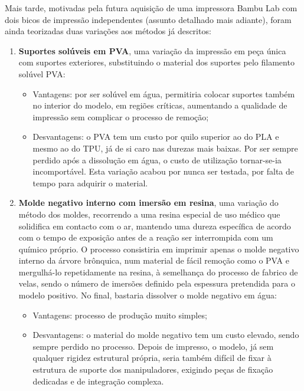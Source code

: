 Mais tarde, motivadas pela futura aquisição de uma impressora Bambu Lab com dois bicos de impressão independentes (assunto detalhado mais adiante), foram ainda teorizadas duas variações aos métodos já descritos:
\begin{enumerate}
  \item \textbf{Suportes solúveis em PVA}, uma variação da impressão em peça única com suportes exteriores, substituindo o material dos suportes pelo filamento solúvel PVA:
  \begin{itemize}
    \item Vantagens: por ser solúvel em água, permitiria colocar suportes também no interior do modelo, em regiões críticas, aumentando a qualidade de impressão sem complicar o processo de remoção;
    \item Desvantagens: o PVA tem um custo por quilo superior ao do PLA e mesmo ao do TPU, já de si caro nas durezas mais baixas. Por ser sempre perdido após a dissolução em água, o custo de utilização tornar-se-ia incomportável. Esta variação acabou por nunca ser testada, por falta de tempo para adquirir o material.
  \end{itemize}

  \item \textbf{Molde negativo interno com imersão em resina}, uma variação do método dos moldes, recorrendo a uma resina especial de uso médico que solidifica em contacto com o ar, mantendo uma dureza específica de acordo com o tempo de exposição antes de a reação ser interrompida com um químico próprio. O processo consistiria em imprimir apenas o molde negativo interno da árvore brônquica, num material de fácil remoção como o PVA e mergulhá-lo repetidamente na resina, à semelhança do processo de fabrico de velas, sendo o número de imersões definido pela espessura pretendida para o modelo positivo. No final, bastaria dissolver o molde negativo em água:
  \begin{itemize}
    \item Vantagens: processo de produção muito simples;
    \item Desvantagens: o material do molde negativo tem um custo elevado, sendo sempre perdido no processo. Depois de impresso, o modelo, já sem qualquer rigidez estrutural própria, seria também difícil de fixar à estrutura de suporte dos manipuladores, exigindo peças de fixação dedicadas e de integração complexa.
  \end{itemize}
\end{enumerate}

